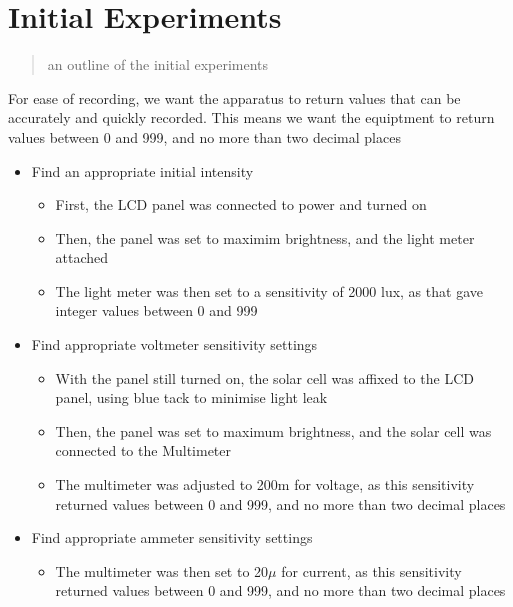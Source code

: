\documentclass{article}
\begin{document}
\section{Initial Experiments}
\begin{quote}
an outline of the initial experiments
\end{quote}
For ease of recording, we want the apparatus to return values that can be accurately and quickly recorded. This means we want the equiptment to return values between 0 and 999, and no more than two decimal places
\begin{itemize}
  \item Find an appropriate initial intensity
  \begin{itemize}
    \item First, the LCD panel was connected to power and turned on
    \item Then, the panel was set to maximim brightness, and the light meter attached
    \item The light meter was then set to a sensitivity of 2000 lux, as that gave integer values between 0 and 999
  \end{itemize}
  \item Find appropriate voltmeter sensitivity settings
  \begin{itemize}
    \item With the panel still turned on, the solar cell was affixed to the LCD panel, using blue tack to minimise light leak
    \item Then, the panel was set to maximum brightness, and the solar cell was connected to the Multimeter
    \item The multimeter was adjusted to 200m for voltage, as this sensitivity returned values between 0 and 999, and no more than two decimal places
  \end{itemize}
  \item Find appropriate ammeter sensitivity settings
  \begin{itemize}
    \item The multimeter was then set to 20$\mu$ for current, as this sensitivity returned values between 0 and 999, and no more than two decimal places
  \end{itemize}
\end{itemize}
\end{document}
